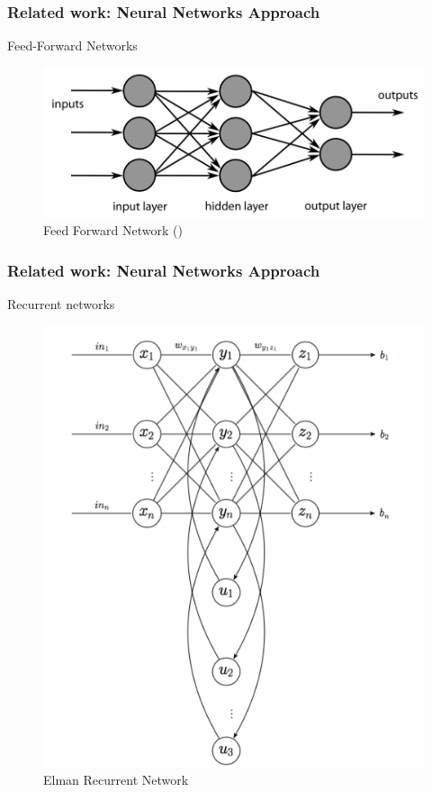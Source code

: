 \documentclass{beamer}
\begin{document}
	
	\begin{frame}
		\frametitle{Related work: Neural Networks Approach}
		\centering
		Feed-Forward Networks
		
		\begin{figure}[h!]
			\begin{minipage}[H]{\linewidth}
				\centering
				\includegraphics[width=\linewidth]{presentation_images/9}
				\caption{Feed Forward Network (\cite{kim2012zmp})}
			\end{minipage}
		\end{figure}
	\end{frame}
	
	
	\begin{frame}
		\frametitle{Related work: Neural Networks Approach}
		\centering
		Recurrent networks 
		
		\begin{figure}[h!]
			\begin{minipage}[H]{\linewidth}
				\centering
				\includegraphics[width=0.5\linewidth]{presentation_images/10}
				\caption{Elman Recurrent Network}
			\end{minipage}
		\end{figure}
	\end{frame}
	
\end{document}
